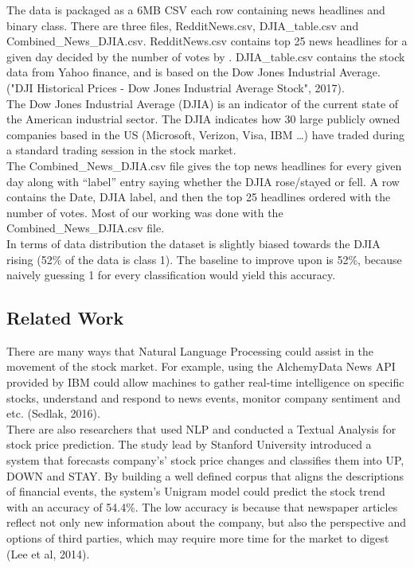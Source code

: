 \documentclass[11pt,a4paper]{article}
\begin{document}
The data is packaged as a 6MB CSV each row containing news headlines and binary class. There are three files, RedditNews.csv, DJIA\_table.csv and Combined\_News\_DJIA.csv. RedditNews.csv contains top 25 news headlines for a given day decided by the number of votes by . DJIA\_table.csv contains the stock data from Yahoo finance, and is based on the Dow Jones Industrial Average. ("DJI Historical Prices - Dow Jones Industrial Average Stock", 2017). \\

The Dow Jones Industrial Average (DJIA) is an indicator of the current state of the American industrial sector. The DJIA indicates how 30 large publicly owned companies based in the US (Microsoft, Verizon, Visa, IBM …) have traded during a standard trading session in the stock market.\\

 The Combined\_News\_DJIA.csv file gives the top news headlines for every given day along with “label” entry saying whether the DJIA rose/stayed or fell. A row contains the Date, DJIA label, and then the top 25 headlines ordered with the number of votes. Most of our working was done with the Combined\_News\_DJIA.csv file.\\

In terms of data distribution the dataset is slightly biased towards the DJIA rising (52\% of the data is class 1). The baseline to improve upon is 52\%, because naively guessing 1 for every classification would yield this accuracy.\\


\subsection{Related Work}
There are many ways that Natural Language Processing could assist in the movement of the  stock market. For example, using the AlchemyData News API provided by IBM could allow machines to gather real-time intelligence on specific stocks, understand and respond to news events, monitor company sentiment and etc. (Sedlak, 2016).\\

There are also researchers that used NLP and conducted a Textual Analysis for stock price prediction. The study lead by Stanford University introduced a system that forecasts company's’ stock price changes and classifies them into UP, DOWN and STAY. By building a well defined corpus that aligns the descriptions of financial events, the system's Unigram model could predict the stock trend with an accuracy of 54.4\%. The low accuracy is because that  newspaper articles reflect not only new information about the company, but also the perspective and options of third parties, which may require more time for the market to digest (Lee et al, 2014).\\
\end{document}

